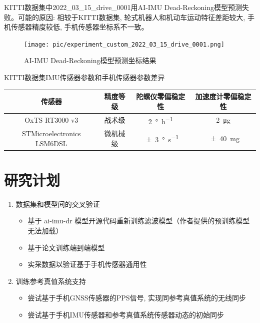 \documentclass{beamer} %
\begin{document}
\begin{frame}
    KITTI数据集中2022\_03\_15\_drive\_0001用AI-IMU Dead-Reckoning模型预测失败。可能的原因: 相较于KITTI数据集, 轮式机器人和机动车运动特征差距较大, 手机传感器精度较低, 手机传感器坐标系不一致。
   \begin{figure}[htbp]
       \centering
       \texttt{[image: pic/experiment\_custom\_2022\_03\_15\_drive\_0001.png]}
       \caption{AI-IMU Dead-Reckoning模型预测坐标结果}
   \end{figure}
\end{frame}

\begin{frame}{KITTI数据集IMU传感器参数和手机传感器参数差异}
    \begin{table}
        \tiny
        \begin{tabular}{cccc}
            \toprule
            传感器 & 精度等级 & 陀螺仪零偏稳定性 & 加速度计零偏稳定性\\
            \midrule
            OxTS RT3000 v3             & 战术级   & \qty{2}{\degree\per\hour}       & \qty{2}{\ug} \\
            STMicroelectronics LSM6DSL & 微机械级 & \qty{\pm 3}{\degree\per\second} & \qty{\pm 40}{\mg} \\
            \bottomrule
        \end{tabular}
    \end{table}
\end{frame}

\section{研究计划}

\begin{frame}
    \begin{enumerate}
        \item 数据集和模型间的交叉验证
        \begin{itemize}
            \item 基于 ai-imu-dr 模型开源代码重新训练滤波模型（作者提供的预训练模型无法加载）
            \item 基于论文\cite{dugne2021understanding}训练端到端模型
            \item 实采数据以验证基于手机传感器通用性
        \end{itemize}

        \item 训练参考真值系统支持
        \begin{itemize}
            \item 尝试基于手机GNSS传感器的PPS信号, 实现同参考真值系统的无线同步
            \item 尝试基于手机IMU传感器和参考真值系统传感器动态的初始同步
        \end{itemize}
    \end{enumerate}
\end{frame}
\end{document}
